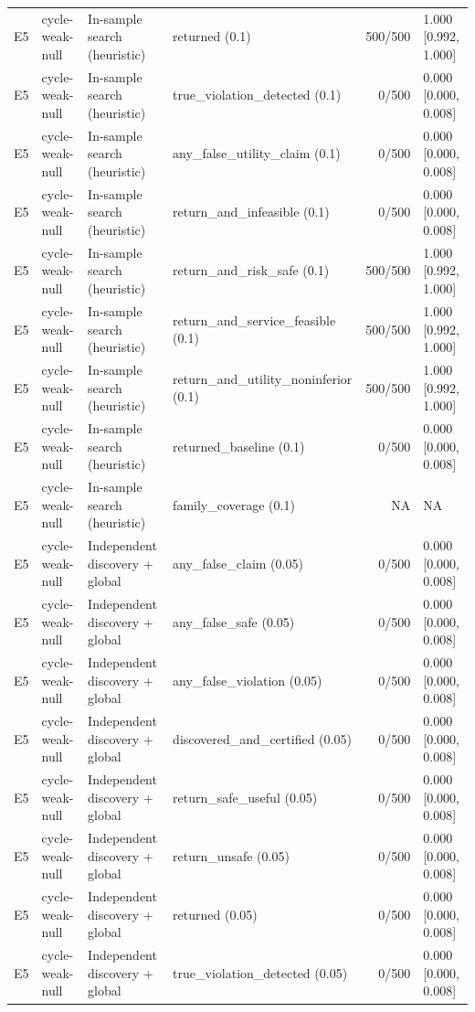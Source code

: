\begin{longtable}{p{.04\linewidth}p{.18\linewidth}p{.19\linewidth}p{.16\linewidth}r p{.21\linewidth}}
E5 & cycle-weak-null & In-sample search (heuristic) & returned (0.1) & 500/500 & 1.000 [0.992, 1.000]\\
E5 & cycle-weak-null & In-sample search (heuristic) & true\_violation\_detected (0.1) & 0/500 & 0.000 [0.000, 0.008]\\
E5 & cycle-weak-null & In-sample search (heuristic) & any\_false\_utility\_claim (0.1) & 0/500 & 0.000 [0.000, 0.008]\\
E5 & cycle-weak-null & In-sample search (heuristic) & return\_and\_infeasible (0.1) & 0/500 & 0.000 [0.000, 0.008]\\
E5 & cycle-weak-null & In-sample search (heuristic) & return\_and\_risk\_safe (0.1) & 500/500 & 1.000 [0.992, 1.000]\\
E5 & cycle-weak-null & In-sample search (heuristic) & return\_and\_service\_feasible (0.1) & 500/500 & 1.000 [0.992, 1.000]\\
E5 & cycle-weak-null & In-sample search (heuristic) & return\_and\_utility\_noninferior (0.1) & 500/500 & 1.000 [0.992, 1.000]\\
E5 & cycle-weak-null & In-sample search (heuristic) & returned\_baseline (0.1) & 0/500 & 0.000 [0.000, 0.008]\\
E5 & cycle-weak-null & In-sample search (heuristic) & family\_coverage (0.1) & NA & NA\\
E5 & cycle-weak-null & Independent discovery + global & any\_false\_claim (0.05) & 0/500 & 0.000 [0.000, 0.008]\\
E5 & cycle-weak-null & Independent discovery + global & any\_false\_safe (0.05) & 0/500 & 0.000 [0.000, 0.008]\\
E5 & cycle-weak-null & Independent discovery + global & any\_false\_violation (0.05) & 0/500 & 0.000 [0.000, 0.008]\\
E5 & cycle-weak-null & Independent discovery + global & discovered\_and\_certified (0.05) & 0/500 & 0.000 [0.000, 0.008]\\
E5 & cycle-weak-null & Independent discovery + global & return\_safe\_useful (0.05) & 0/500 & 0.000 [0.000, 0.008]\\
E5 & cycle-weak-null & Independent discovery + global & return\_unsafe (0.05) & 0/500 & 0.000 [0.000, 0.008]\\
E5 & cycle-weak-null & Independent discovery + global & returned (0.05) & 0/500 & 0.000 [0.000, 0.008]\\
E5 & cycle-weak-null & Independent discovery + global & true\_violation\_detected (0.05) & 0/500 & 0.000 [0.000, 0.008]\\

\end{longtable}

